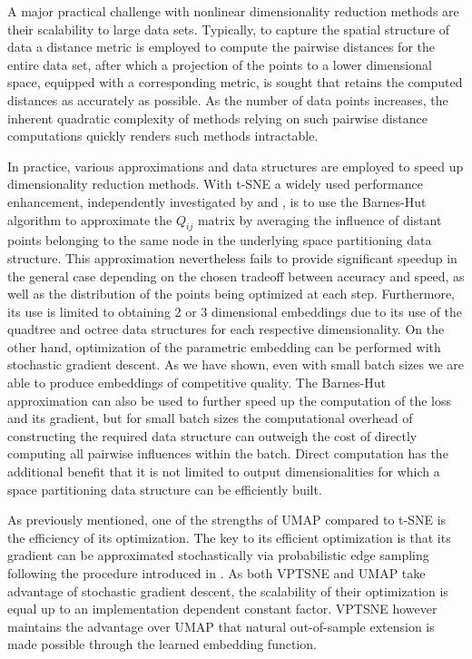 A major practical challenge with nonlinear dimensionality reduction methods are their scalability to large data sets. Typically, to capture the spatial structure of data a distance metric is employed to compute the pairwise distances for the entire data set, after which a projection of the points to a lower dimensional space, equipped with a corresponding metric, is sought that retains the computed distances as accurately as possible. As the number of data points increases, the inherent quadratic complexity of methods relying on such pairwise distance computations quickly renders such methods intractable.

In practice, various approximations and data structures are employed to speed up dimensionality reduction methods. With t-SNE a widely used performance enhancement, independently investigated by \cite{accelerated_tsne_1} and \cite{accelerated_tsne_2}, is to use the Barnes-Hut algorithm \citep{barnes_hut} to approximate the $Q_{ij}$ matrix by averaging the influence of distant points belonging to the same node in the underlying space partitioning data structure. This approximation nevertheless fails to provide significant speedup in the general case depending on the chosen tradeoff between accuracy and speed, as well as the distribution of the points being optimized at each step. Furthermore, its use is limited to obtaining 2 or 3 dimensional embeddings due to its use of the quadtree and octree data structures for each respective dimensionality. On the other hand, optimization of the parametric embedding can be performed with stochastic gradient descent. As we have shown, even with small batch sizes we are able to produce embeddings of competitive quality. The Barnes-Hut approximation can also be used to further speed up the computation of the loss and its gradient, but for small batch sizes the computational overhead of constructing the required data structure can outweigh the cost of directly computing all pairwise influences within the batch. Direct computation has the additional benefit that it is not limited to output dimensionalities for which a space partitioning data structure can be efficiently built.

As previously mentioned, one of the strengths of UMAP compared to t-SNE is the efficiency of its optimization. The key to its efficient optimization is that its gradient can be approximated stochastically via probabilistic edge sampling following the procedure introduced in \citep{largevis}. As both VPTSNE and UMAP take advantage of stochastic gradient descent, the scalability of their optimization is equal up to an implementation dependent constant factor. VPTSNE however maintains the advantage over UMAP that natural out-of-sample extension is made possible through the learned embedding function.

